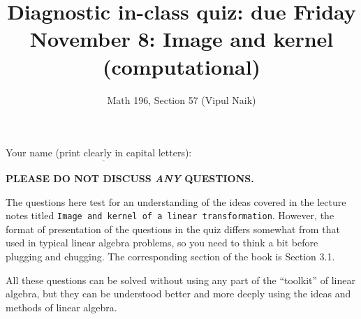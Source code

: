 \documentclass[10pt]{amsart}
\title{Diagnostic in-class quiz: due Friday November 8: Image and kernel (computational)}
\author{Math 196, Section 57 (Vipul Naik)}
\begin{document}
\maketitle

Your name (print clearly in capital letters): $\underline{\qquad\qquad\qquad\qquad\qquad\qquad\qquad\qquad\qquad\qquad}$

{\bf PLEASE DO NOT DISCUSS {\em ANY} QUESTIONS.}

The questions here test for an understanding of the ideas covered in
the lecture notes titled {\tt Image and kernel of a linear
  transformation}. However, the format of presentation of the
questions in the quiz differs somewhat from that used in typical
linear algebra problems, so you need to think a bit before plugging
and chugging. The corresponding section of the book is Section 3.1.

All these questions can be solved without using any part of the
``toolkit'' of linear algebra, but they can be understood better and
more deeply using the ideas and methods of linear algebra.
\end{document}

